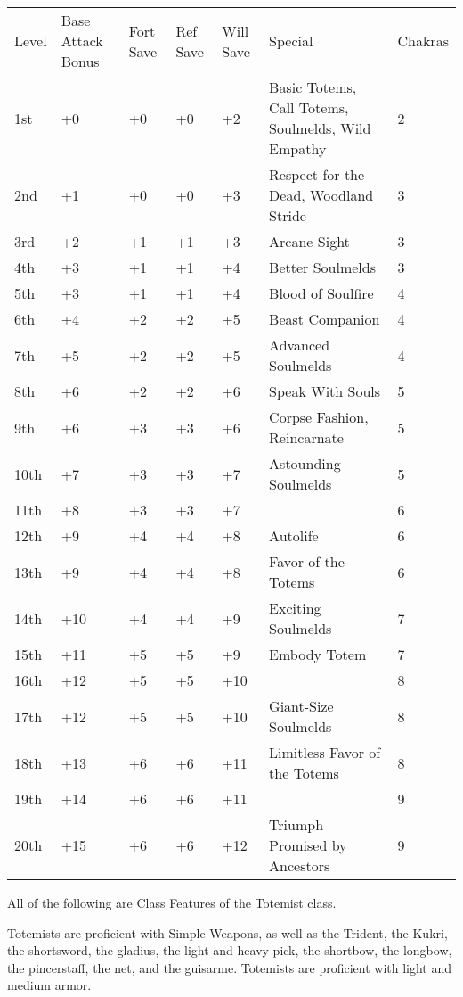 \begin{table}[htb]
\begin{small}
\begin{tabular}[h]{lp{1.9cm}p{0.7cm}p{0.7cm}p{0.7cm}p{9cm}l}
Level&Base Attack Bonus&Fort Save&Ref Save&Will Save&Special& Chakras\\
1st&  +0&  +0& +0& +2&  Basic Totems, Call Totems, Soulmelds, Wild Empathy& 2\\
2nd&  +1&  +0& +0& +3&  Respect for the Dead, Woodland Stride& 3\\
3rd&  +2&  +1& +1& +3&  Arcane Sight& 3\\
4th&  +3&  +1& +1& +4&  Better Soulmelds& 3\\
5th&  +3&  +1& +1& +4&  Blood of Soulfire& 4\\
6th&  +4&  +2& +2& +5&  Beast Companion& 4\\
7th&  +5&  +2& +2& +5&  Advanced Soulmelds& 4\\
8th&  +6&  +2& +2& +6&  Speak With Souls& 5\\
9th&  +6&  +3& +3& +6&  Corpse Fashion, Reincarnate& 5\\
10th& +7&  +3& +3& +7&  Astounding Soulmelds& 5\\
11th& +8&  +3& +3& +7&  & 6\\
12th& +9&  +4& +4& +8&  Autolife& 6\\
13th& +9&  +4& +4& +8&  Favor of the Totems& 6\\
14th& +10& +4& +4& +9&  Exciting Soulmelds& 7\\
15th& +11& +5& +5& +9&  Embody Totem& 7\\
16th& +12& +5& +5& +10&  & 8\\
17th& +12& +5& +5& +10&  Giant-Size Soulmelds& 8\\
18th& +13& +6& +6& +11&  Limitless Favor of the Totems& 8\\
19th& +14& +6& +6& +11&  & 9\\
20th& +15& +6& +6& +12&  Triumph Promised by Ancestors& 9\\
\end{tabular}
\end{small}
\end{table}\smallskip\noindent All of the following are Class Features of the Totemist class.


 Totemists are proficient with Simple Weapons, as well as the Trident, the Kukri, the shortsword, the gladius, the light and heavy pick, the shortbow, the longbow, the pincerstaff, the net, and the guisarme. Totemists are proficient with light and medium armor.

